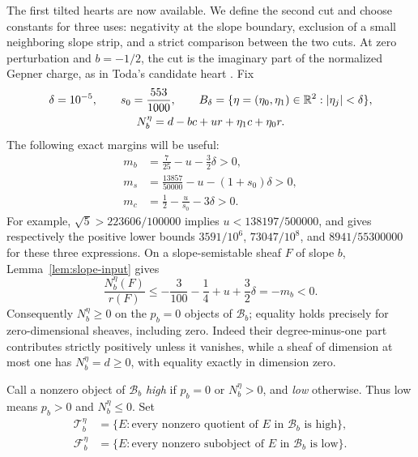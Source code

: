 The first tilted hearts are now available. We define the second cut and choose
constants for three uses: negativity at the slope boundary, exclusion of a
small neighboring slope strip, and a strict comparison between the two cuts.
At zero perturbation and $b=-1/2$, the cut is the imaginary part of the
normalized Gepner charge, as in Toda's candidate heart
\cite[Section~3.6]{TodaQuintic2013}. Fix
\begin{equation}\label{eq:aisle-parameters}
 \begin{gathered}
 \delta=10^{-5},\qquad s_0=\frac{553}{1000},\qquad
 B_\delta=\{\eta=(\eta_0,\eta_1)\in\mathbb R^2:|\eta_j|<\delta\},\\
 N_b^\eta=d-bc+ur+\eta_1c+\eta_0r.
 \end{gathered}
\end{equation}
The following exact margins will be useful:
\begin{align}
 m_b&=\frac7{25}-u-\frac32\delta>0,\label{eq:boundary-margin}\\
 m_s&=\frac{13857}{50000}-u-(1+s_0)\delta>0,
                                                    \label{eq:strip-margin}\\
 m_c&=\frac12-\frac{u}{s_0}-3\delta>0.\label{eq:comparison-margin}
\end{align}
For example, $\sqrt5>223606/100000$ implies
$u<138197/500000$, and gives respectively the positive lower bounds
$3591/10^6$, $73047/10^8$, and $8941/55300000$ for these three
expressions.  On a slope-semistable sheaf $F$ of slope $b$,
Lemma~\ref{lem:slope-input} gives
\begin{equation}\label{eq:boundary-negative}
 \frac{N_b^\eta(F)}{r(F)}
 \leq -\frac3{100}-\frac14+u+\frac32\delta=-m_b<0.
\end{equation}
Consequently $N_b^\eta\geq0$ on the $p_b=0$ objects of $\mathcal B_b$;
equality holds precisely for zero-dimensional sheaves, including zero.
Indeed their degree-minus-one part contributes strictly positively
unless it vanishes, while a sheaf of dimension at most one has
$N_b^\eta=d\geq0$, with equality exactly in dimension zero.

Call a nonzero object of $\mathcal B_b$ \emph{high} if $p_b=0$ or
$N_b^\eta>0$, and \emph{low} otherwise.  Thus low means $p_b>0$ and
$N_b^\eta\leq0$.  Set
\[
\begin{split}
 \mathcal T_b^\eta&=\{E:\text{every nonzero quotient of $E$ in
                                  $\mathcal B_b$ is high}\},\\
 \mathcal F_b^\eta&=\{E:\text{every nonzero subobject of $E$ in
                                  $\mathcal B_b$ is low}\}.
\end{split}
\]

